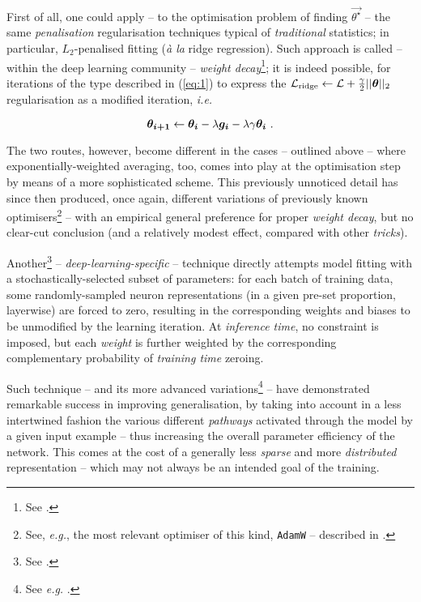 First of all, one could apply -- to the optimisation problem of finding $\vec{\theta^{\star}}$ -- the same \textit{penalisation} regularisation techniques typical of \textit{traditional} statistics; in particular, $L_2$-penalised fitting (\textit{à la} ridge regression). Such approach is called -- within the deep learning community -- \textit{weight decay}\footnote{See \cite{KroghPalmer1991WeightDecay}.}; it is indeed possible, for iterations of the type described in (\ref{eq:1}) to express the $\mathcal{L}_{\text{ridge}} \leftarrow \mathcal{L} + \frac{\gamma}{2}||\bm{\theta}||_2$ regularisation as a modified iteration, \textit{i.e.}

$$\bm{\theta_{i+1}} \leftarrow  \bm{\theta_{i}} - \lambda\bm{g_i} - \lambda\gamma\bm{\theta_i}\text{ .}$$

The two routes, however, become different in the cases -- outlined above -- where exponentially-weighted averaging, too, comes into play at the optimisation step by means of a more sophisticated scheme. This previously unnoticed detail has since then produced, once again, different variations of previously known optimisers\footnote{See, \textit{e.g.}, the most relevant optimiser of this kind, \texttt{AdamW} -- described in \cite{LoshchilovHutter2018AdamW}.} -- with an empirical general preference for proper \textit{weight decay}, but no clear-cut conclusion (and a relatively modest effect, compared with other \textit{tricks}).

Another\footnote{See \cite{SirvastavaEtAl2014Dropout}.} -- \textit{deep-learning-specific} -- technique directly attempts model fitting with a stochastically-selected subset of parameters: for each batch of training data, some randomly-sampled neuron representations (in a given pre-set proportion, layerwise) are forced to zero, resulting in the corresponding weights and biases to be unmodified by the learning iteration. At \textit{inference time}, no constraint is imposed, but each \textit{weight} is further weighted by the corresponding complementary probability of \textit{training time} zeroing.

Such technique -- and its more advanced variations\footnote{See \textit{e.g.} \cite{BolukiEtAl2020BernoulliDropout}.} -- have demonstrated remarkable success in improving generalisation, by taking into account in a less intertwined fashion the various different \textit{pathways} activated through the model by a given input example -- thus increasing the overall parameter efficiency of the network. This comes at the cost of a generally less \textit{sparse} and more \textit{distributed} representation -- which may not always be an intended goal of the training.

